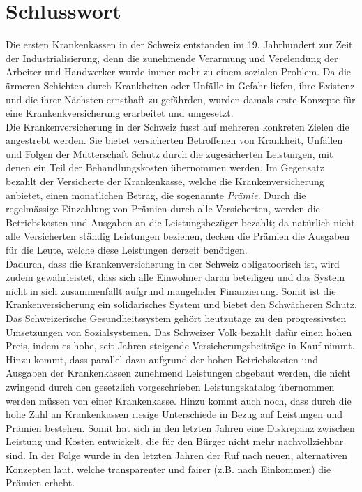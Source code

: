 \documentclass[a4paper,12pt]{book}
\begin{document}
\chapter{Schlusswort}
Die ersten Krankenkassen in der Schweiz entstanden im 19. Jahrhundert zur Zeit der Industrialisierung, denn die zunehmende Verarmung und Verelendung der Arbeiter und Handwerker wurde immer mehr zu einem sozialen Problem. Da die ärmeren Schichten durch Krankheiten oder Unfälle in Gefahr liefen, ihre Existenz und die ihrer Nächsten ernsthaft zu gefährden, wurden damals erste Konzepte für eine Krankenkversicherung erarbeitet und umgesetzt.\newline\\
Die Krankenversicherung in der Schweiz fusst auf mehreren konkreten Zielen die angestrebt werden. Sie bietet versicherten Betroffenen von Krankheit, Unfällen und Folgen der Mutterschaft Schutz durch die zugesicherten Leistungen, mit denen ein Teil der Behandlungskosten übernommen werden. Im Gegensatz bezahlt der Versicherte der Krankenkasse, welche die Krankenversicherung anbietet, einen monatlichen Betrag, die sogenannte \emph{Prämie}. Durch die regelmässige Einzahlung von Prämien durch alle Versicherten, werden die Betriebskosten und Ausgaben an die Leistungsbezüger bezahlt; da natürlich nicht alle Versicherten ständig Leistungen beziehen, decken die Prämien die Ausgaben für die Leute, welche diese Leistungen derzeit benötigen.\newline\\
Dadurch, dass die Krankenversicherung in der Schweiz obligatoorisch ist, wird zudem gewährleistet, dass sich alle Einwohner daran beteiligen und das System nicht in sich zusammenfällt aufgrund mangelnder Finanzierung.
Somit ist die Krankenversicherung ein solidarisches System und bietet den Schwächeren Schutz.\newline
Das Schweizerische Gesundheitssystem gehört heutzutage zu den progressivsten Umsetzungen von Sozialsystemen. Das Schweizer Volk bezahlt dafür einen hohen Preis, indem es hohe, seit Jahren steigende Versicherungsbeiträge in Kauf nimmt. Hinzu kommt, dass parallel dazu aufgrund der hohen Betriebskosten und Ausgaben der Krankenkassen zunehmend Leistungen abgebaut werden, die nicht zwingend durch den gesetzlich vorgeschrieben Leistungskatalog übernommen werden müssen von einer Krankenkasse. Hinzu kommt auch noch, dass durch die hohe Zahl an Krankenkassen riesige Unterschiede in Bezug auf Leistungen und Prämien bestehen. Somit hat sich in den letzten Jahren eine Diskrepanz zwischen Leistung und Kosten entwickelt, die für den Bürger nicht mehr nachvollziehbar sind. In der Folge wurde in den letzten Jahren der Ruf nach neuen, alternativen Konzepten laut, welche transparenter und fairer (z.B. nach Einkommen) die Prämien erhebt.\\\newline
\end{document}
